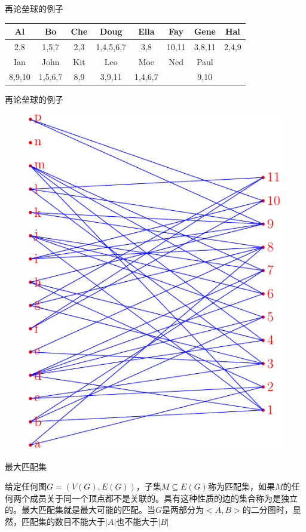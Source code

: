 \documentclass[UTF8]{ctexbeamer}
\begin{document}
\begin{frame}{再论垒球的例子}
  \begin{table}
    \centering
    \begin{tabular}{c|c|c|c|c|c|c|c}
      \hline
      Al & Bo & Che & Doug & Ella & Fay & Gene & Hal\\
      \hline
      2,8 & 1,5,7 & 2,3 & 1,4,5,6,7 & 3,8 & 10,11 & 3,8,11 & 2,4,9\\
      \hline
      Ian & John & Kit & Leo & Moe & Ned & Paul & \\
      \hline
      8,9,10 & 1,5,6,7 & 8,9 & 3,9,11 & 1,4,6,7 && 9,10 &\\
      \hline
    \end{tabular}
  \end{table}
\end{frame}

\begin{frame}{再论垒球的例子}
  \begin{figure}
    \centering
    \includegraphics[width=.5\textwidth]{baseball.pdf}
  \end{figure}
\end{frame}

\begin{frame}{最大匹配集}
  \begin{block}{}
    给定任何图$G=(V(G), E(G))$，子集$M \subseteq E(G)$称为匹配集，如果$M$的任何两个成员关于同一个顶点都不是关联的。具有这种性质的边的集合称为是独立的。最大匹配集就是最大可能的匹配。当$G$是两部分为$<A, B>$的二分图时，显然，匹配集的数目不能大于$|A|$也不能大于$|B|$
  \end{block}
\end{frame}
\end{document}
